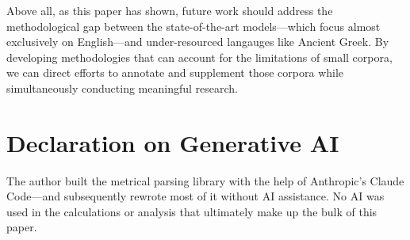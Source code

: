 \documentclass[
]{ceurart}
\begin{document}
Above all, as this paper has shown, future work should address the
methodological gap between the state-of-the-art models---which focus almost
exclusively on English---and under-resourced langauges like Ancient Greek. By
developing methodologies that can account for the limitations of small
corpora, we can direct efforts to annotate and supplement those corpora while
simultaneously conducting meaningful research.





\section{Declaration on Generative AI}

The author built the metrical parsing library with the help of Anthropic's
Claude Code---and subsequently rewrote most of it without AI assistance. No
AI was used in the calculations or analysis that ultimately make up the bulk
of this paper.



\end{document}
